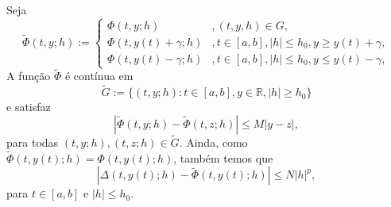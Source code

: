 \begin{dem}
  Seja
  \begin{equation}
    \tilde{\Phi}(t, y; h) := \left\{
      \begin{array}{ll}
        \Phi(t, y; h) &, (t, y, h)\in G,\\
        \Phi(t, y(t)+\gamma; h) &, t\in [a, b], |h|\leq h_0, y\geq y(t)+\gamma,\\
        \Phi(t, y(t)-\gamma; h) &, t\in [a, b], |h|\leq h_0, y\leq y(t)-\gamma,
      \end{array}
    \right.
  \end{equation}
  A função $\tilde{\Phi}$ é contínua em
  \begin{equation}
    \tilde{G} := \{(t, y; h): t\in [a, b], y\in\mathbb{R}, |h|\geq h_0\}
  \end{equation}
  e satisfaz
  \begin{equation}\label{cap_pvi_sec_taylor:eq:aux0}
    \left|\tilde{\Phi}(t, y; h) - \tilde{\Phi}(t, z; h)\right| \leq M|y - z|,
  \end{equation}
  para todas $(t, y; h), (t, z; h)\in \tilde{G}$. Ainda, como $\tilde{\Phi}(t, y(t); h) = \Phi(t, y(t); h)$, também temos que
  \begin{equation}\label{cap_pvi_sec_taylor:eq:aux1}
    |\Delta(t, y(t); h) - \tilde{\Phi}(t, y(t); h)| \leq N |h|^p,
  \end{equation}
  para $t\in [a, b]$ e $|h|\leq h_0$.


\end{dem}
